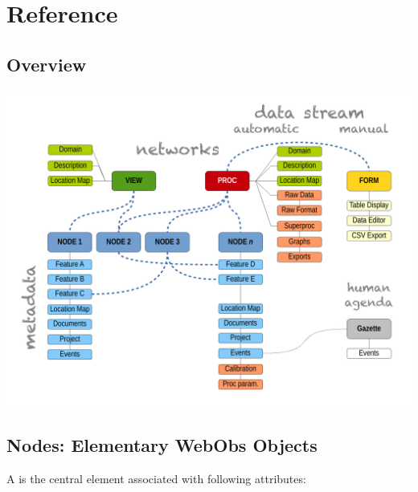 \chapter{Reference}

\section{Overview}

\includegraphics[width=\textwidth]{figures/webobs_diagram.pdf}

\section{Nodes: Elementary WebObs Objects}

A  is the central \webobs element associated with following attributes:

